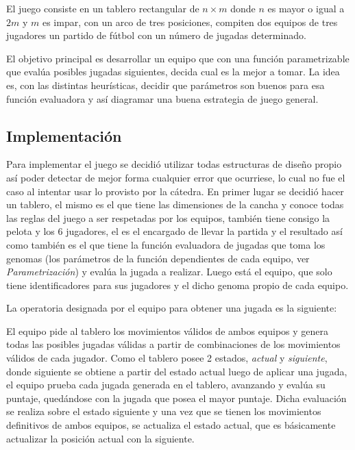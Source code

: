 
El juego consiste en un tablero rectangular de $n \times m$ donde $n$ es mayor o
igual a $2m$ y $m$ es impar, con un arco de tres posiciones, compiten dos
equipos de tres jugadores un partido de fútbol con un número de jugadas
determinado.


El objetivo principal es desarrollar un equipo que con una función parametrizable
que evalúa posibles jugadas siguientes, decida cual es la mejor a tomar.
La idea es, con las distintas heurísticas, decidir que parámetros son buenos para esa
función evaluadora y así diagramar una buena estrategia de juego general.\\

\subsection{Implementación}


Para implementar el juego se decidió utilizar todas estructuras de diseño propio
así poder detectar de mejor forma cualquier error que ocurriese, lo cual no fue
el caso al intentar usar lo provisto por la cátedra. En primer lugar se decidió
hacer un tablero, el mismo es el que tiene las dimensiones de la cancha y conoce
todas las reglas del juego a ser respetadas por los equipos, también tiene
consigo la pelota y los 6 jugadores, el es el encargado de llevar la partida y
el resultado así como también es el que tiene la función evaluadora de jugadas
que toma los genomas (los parámetros de la función dependientes de cada equipo,
ver {\it Parametrización\/}) y evalúa la jugada a realizar. Luego está el
equipo, que solo tiene identificadores para sus jugadores y el dicho genoma
propio de cada equipo.


La operatoria designada por el equipo para obtener una jugada es la siguiente:

El equipo pide al tablero los movimientos válidos de ambos equipos y genera todas las
posibles jugadas válidas a partir de combinaciones de los movimientos válidos de
cada jugador. Como el tablero posee 2 estados, {\it actual\/} y {\it
  siguiente}, donde siguiente se obtiene a partir del estado actual luego de
aplicar una jugada, el equipo prueba cada jugada generada en el tablero,
avanzando y evalúa su puntaje, quedándose con la jugada que posea el mayor
puntaje. Dicha evaluación se realiza sobre el estado siguiente y una vez que se
tienen los movimientos definitivos de ambos equipos, se actualiza el estado
actual, que es básicamente actualizar la posición actual con la siguiente.

